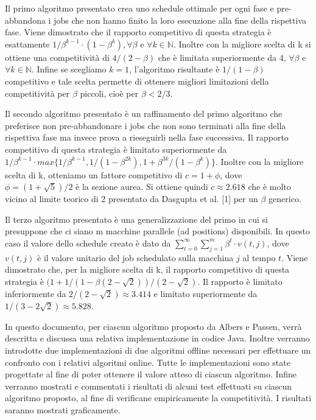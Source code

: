 \documentclass[12pt]{article}
\newcommand*{\N}{\mathbb{N}}
\begin{document}
Il primo algoritmo presentato crea uno schedule ottimale per ogni fase e pre-abbandona i jobs che non hanno finito la loro esecuzione alla fine della rispettiva fase. Viene dimostrato che il rapporto competitivo di questa strategia è esattamente $1/\beta^{k-1}\cdot(1-\beta^{k}), \forall \beta$ e $\forall k \in \N$. Inoltre con la migliore scelta di k si ottiene una competitività di $4/(2 - \beta)$ che è limitata superiormente da 4, $\forall \beta$ e $\forall k \in \N$. Infine se scegliamo $k = 1$, l’algoritmo risultante è $1/(1-\beta)$ competitivo e tale scelta permette di ottenere migliori limitazioni della competitività per $\beta$ piccoli, cioè per $\beta < 2/3$.

Il secondo algoritmo presentato è un raffinamento del primo algoritmo che preferisce non pre-abbandonare i jobs che non sono terminati alla fine della rispettiva fase ma invece prova a rieseguirli nella fase successiva. Il rapporto competitivo di questa strategia è limitato superiormente da $1/\beta^{k-1} \cdot max\{1/\beta^{k-1}, 1/(1 - \beta^{2k} ), 1 + \beta^{3k}/(1 - \beta^{k} )\}$. Inoltre con la migliore scelta di k, otteniamo un fattore competitivo di $c = 1 + \phi$, dove $\phi = (1 + \sqrt{5})/2$ è la sezione aurea. Si ottiene quindi $c \approx 2.618$ che è molto vicino al limite teorico di 2 presentato da Dasgupta et al. [1] per un $\beta$ generico.

Il terzo algoritmo presentato è una generalizzazione del primo in cui si presuppone che ci siano m macchine parallele (ad positions) disponibili. In questo caso il valore dello schedule creato è dato da $\sum_ {t = 0}^{\infty}\sum_{j = 1}^{m}\beta^{t}\cdot v(t,j)$, dove $v(t,j)$ è il valore unitario del job schedulato sulla macchina $j$ al tempo $t$. Viene dimostrato che, per la migliore scelta di k, il rapporto competitivo di questa strategia è $(1 + 1/(1 - \beta(2 - \sqrt{2}))/(2 - \sqrt{2})$. Il rapporto è limitato inferiormente da $2/(2-\sqrt{2}) \approx 3.414$ e limitato superiormente da $1/(3 - 2\sqrt{2}) \approx 5.828$.

In questo documento, per ciascun algoritmo proposto da Albers e Passen, verrà descritta e discussa una relativa implementazione in codice Java. Inoltre verranno introdotte due implementazioni di due algoritmi offline necessari per effettuare un confronto con i relativi algoritmi online. Tutte le implementazioni sono state progettate al fine di poter ottenere il valore atteso di ciascun algoritmo. Infine verranno mostrati e commentati i risultati di alcuni test effettuati su ciascun algoritmo proposto, al fine di verificane empiricamente la competitività. I risultati saranno mostrati graficamente.
\end{document}
